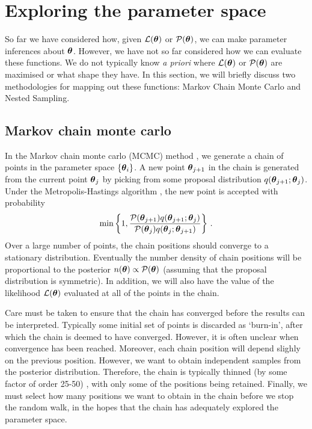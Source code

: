 \section{Exploring the parameter space}

So far we have considered how, given $\mathcal{L}(\boldsymbol\theta)$ or $\mathcal{P}(\boldsymbol\theta)$, we can make parameter inferences about $\boldsymbol\theta$. However, we have not so far considered how we can evaluate these functions. We do not typically know \textit{a priori} where $\mathcal{L}(\boldsymbol\theta)$ or $\mathcal{P}(\boldsymbol\theta)$ are maximised or what shape they have. In this section, we will briefly discuss two methodologies for mapping out these functions: Markov Chain Monte Carlo and Nested Sampling.

\subsection{Markov chain monte carlo}


In the Markov chain monte carlo (MCMC) method \cite{Lewis:2009}, we generate a chain of points in the parameter space $\left\{\boldsymbol\theta_i\right\}$. A new point $\boldsymbol\theta_{j+1}$ in the chain is generated from the current point $\boldsymbol\theta_{j}$ by picking from some proposal distribution $q(\boldsymbol\theta_{j+1}; \boldsymbol\theta_{j})$. Under the Metropolis-Hastings algorithm \cite{Metropolis:1953}, the new point is accepted with probability
\begin{equation}
\textrm{min}\left\{1, \frac{\mathcal{P}(\boldsymbol\theta_{j+1})q(\boldsymbol\theta_{j+1};\boldsymbol\theta_{j})}{\mathcal{P}(\boldsymbol\theta_{j})q(\boldsymbol\theta_{j};\boldsymbol\theta_{j+1})} \right\}\,.
\end{equation}
Over a large number of points, the chain positions should converge to a stationary distribution. Eventually the number density of chain positions will be proportional to the posterior \(n(\boldsymbol\theta) \propto \mathcal{P}(\boldsymbol\theta)\) (assuming that the proposal distribution is symmetric). In addition, we will also have the value of the likelihood $\mathcal{L}(\boldsymbol\theta)$ evaluated at all of the points in the chain.

Care must be taken to ensure that the chain has converged before the results can be interpreted. Typically some initial set of points is discarded as `burn-in', after which the chain is deemed to have converged. However, it is often unclear when convergence has been reached. Moreover, each chain position will depend slighly on the previous position. However, we want to obtain independent samples from the posterior distribution. Therefore, the chain is typically thinned (by some factor of order 25-50) \cite{Lewis:2002}, with only some of the positions being retained. Finally, we must select how many positions we want to obtain in the chain before we stop the random walk, in the hopes that the chain has adequately explored the parameter space.

